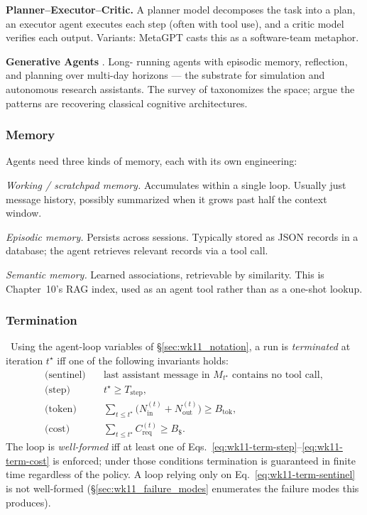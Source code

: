 \textbf{Planner--Executor--Critic.} A planner model decomposes
the task into a plan, an executor agent executes each step
(often with tool use), and a critic model verifies each output.
Variants: MetaGPT \citep{hong2024metagpt} casts this as a
software-team metaphor.

\textbf{Generative Agents} \citep{park2023generative}. Long-
running agents with episodic memory, reflection, and planning
over multi-day horizons --- the substrate for simulation and
autonomous research assistants. The survey of
\citet{wang2024agentsurvey} taxonomizes the space;
\citet{sumers2023cognitive} argue the patterns are recovering
classical cognitive architectures.

\subsubsection{Memory}

Agents need three kinds of memory, each with its own engineering:

\emph{Working / scratchpad memory.} Accumulates within a single
loop. Usually just message history, possibly summarized when it
grows past half the context window.

\emph{Episodic memory.} Persists across sessions. Typically
stored as JSON records in a database; the agent retrieves
relevant records via a tool call.

\emph{Semantic memory.} Learned associations, retrievable by
similarity. This is Chapter~10's RAG index, used as an agent tool
rather than as a one-shot lookup.

\subsubsection{Termination}

\Def\ Using the agent-loop variables of
\S\ref{sec:wk11_notation}, a run is \emph{terminated} at iteration
$t^\star$ iff one of the following invariants holds:
\begin{align}
  \text{(sentinel)} \quad
      & \text{last assistant message in } M_{t^\star}
        \text{ contains no tool call},
      \label{eq:wk11-term-sentinel} \\
  \text{(step)} \quad
      & t^\star \ge T_\mathrm{step},
      \label{eq:wk11-term-step} \\
  \text{(token)} \quad
      & \sum_{t \le t^\star} \bigl(N_\mathrm{in}^{(t)} +
        N_\mathrm{out}^{(t)}\bigr) \ge B_\mathrm{tok},
      \label{eq:wk11-term-token} \\
  \text{(cost)} \quad
      & \sum_{t \le t^\star} C_\mathrm{req}^{(t)}
        \ge B_\${}.
      \label{eq:wk11-term-cost}
\end{align}
The loop is \emph{well-formed} iff at least one of
Eqs.~\eqref{eq:wk11-term-step}--\eqref{eq:wk11-term-cost} is
enforced; under those conditions termination is
guaranteed in finite time regardless of the policy. A loop relying
only on Eq.~\eqref{eq:wk11-term-sentinel} is not well-formed
(\S\ref{sec:wk11_failure_modes} enumerates the failure modes this
produces).

